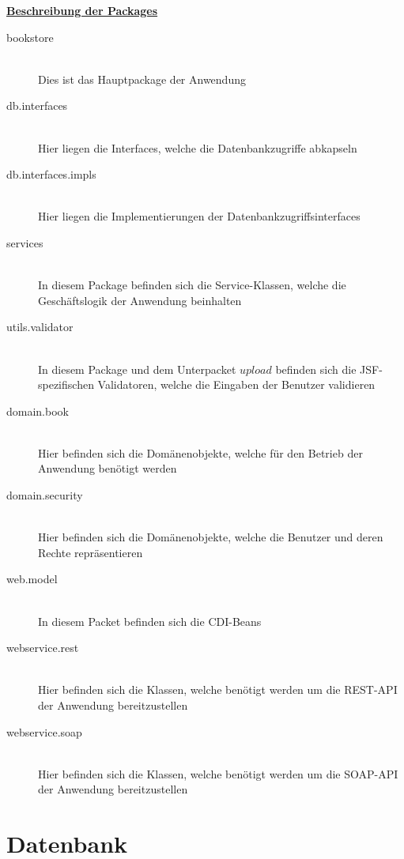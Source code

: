 \documentclass[12pt,a4paper]{book}
\begin{document}
	\underline{\textbf{Beschreibung der Packages}}
		\begin{description}
			\item[bookstore] \hfill \\
			 Dies ist das Hauptpackage der Anwendung
			 	\item[db.interfaces] \hfill \\
				 	Hier liegen die Interfaces, welche die Datenbankzugriffe abkapseln
			 		\item[db.interfaces.impls] \hfill \\
			 		Hier liegen die Implementierungen der Datenbankzugriffsinterfaces
			 	\item[services] \hfill \\
			 	In diesem Package befinden sich die Service-Klassen, welche die Geschäftslogik der Anwendung beinhalten
			\item[utils.validator] \hfill \\
		In diesem Package und dem Unterpacket $upload$ befinden sich die JSF-spezifischen Validatoren, welche die Eingaben der Benutzer validieren
		\item[domain.book] \hfill \\
		Hier befinden sich die Domänenobjekte, welche für den Betrieb der Anwendung benötigt werden 
		\item[domain.security] \hfill \\
		Hier befinden sich die Domänenobjekte, welche die Benutzer und deren Rechte repräsentieren
		\item[web.model] \hfill \\
		In diesem Packet befinden sich die CDI-Beans
		\item[webservice.rest] \hfill \\
		Hier befinden sich die Klassen, welche benötigt werden um die REST-API der Anwendung bereitzustellen
		\item[webservice.soap] \hfill \\
		Hier befinden sich die Klassen, welche benötigt werden um die SOAP-API der Anwendung bereitzustellen
		\end{description}
		
		\chapter{Datenbank}
		\vspace{1cm}
		
\end{document}
